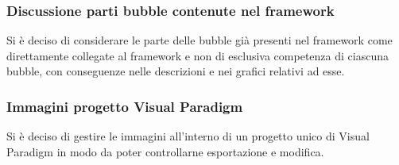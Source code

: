 \subsubsection{Discussione parti bubble contenute nel framework }
Si è deciso di considerare le parte delle bubble già presenti nel framework come direttamente collegate al framework e non di esclusiva competenza di ciascuna bubble, con conseguenze nelle descrizioni e nei grafici relativi ad esse.

\subsubsection{Immagini progetto Visual Paradigm}
Si è deciso di gestire le immagini all'interno di un progetto unico di Visual Paradigm in modo da poter controllarne esportazione e modifica.

\clearpage
